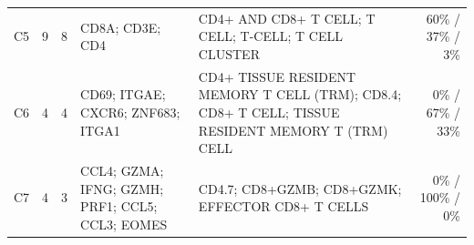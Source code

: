\begin{table}[ht!]
\begin{tabular}{@{}l r r p{2.7cm} p{8.0cm} r@{}}
  C5 & 9 & 8 & CD8A; CD3E; CD4 & CD4+ AND CD8+ T CELL; T CELL; T-CELL; T CELL CLUSTER & 60\% / 37\% / 3\% \\ [3pt]
  C6 & 4 & 4 & CD69; ITGAE; CXCR6; ZNF683; ITGA1 & CD4+ TISSUE RESIDENT MEMORY T CELL (TRM); CD8.4; CD8+ T CELL; TISSUE RESIDENT MEMORY T (TRM) CELL & 0\% / 67\% / 33\% \\ [3pt]
  C7 & 4 & 3 & CCL4; GZMA; IFNG; GZMH; PRF1; CCL5; CCL3; EOMES & CD4.7; CD8+GZMB; CD8+GZMK; EFFECTOR CD8+ T CELLS & 0\% / 100\% / 0\% \\ [3pt]
  \bottomrule
  \end{tabular}
\end{table}
